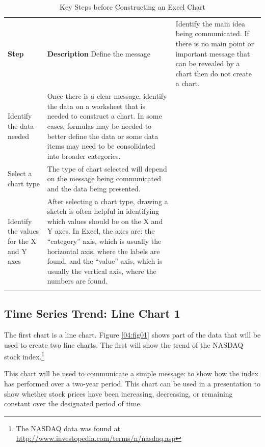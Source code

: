 \begin{table}[H]
	{\small
		\begin{longtable}{L{0.75in}L{3.50in}} %
			\textbf{Step} & \textbf{Description} \endhead
			\hline
			Define the message & Identify the main idea being communicated. If there is no main point or important message that can be revealed by a chart then do not create a chart.\\
			Identify the data needed & Once there is a clear message, identify the data on a worksheet that is needed to construct a chart. In some cases, formulas may be needed to better define the data or some data items may need to be consolidated into broader categories.\\
			Select a chart type & The type of chart selected will depend on the message being communicated and the data being presented.\\
			Identify the values for the X and Y axes & After selecting a chart type, drawing a sketch is often helpful in identifying which values should be on the X and Y axes. In Excel, the axes are: the ``category'' axis, which is usually the horizontal axis, where the labels are found, and the ``value'' axis, which is usually the vertical axis, where the numbers are found.\\
			\caption{Key Steps before Constructing an Excel Chart}
			\label{04:tab01}
		\end{longtable}
	} %
\end{table}

\subsection{Time Series Trend: Line Chart 1}

The first chart is a line chart. Figure \ref{04:fig01} shows part of the data that will be used to create two line charts. The first will show the trend of the NASDAQ stock index.\footnote{The NASDAQ data was found at \url{http://www.investopedia.com/terms/n/nasdaq.asp}}

This chart will be used to communicate a simple message: to show how the index has performed over a two-year period. This chart can be used in a presentation to show whether stock prices have been increasing, decreasing, or remaining constant over the designated period of time.

